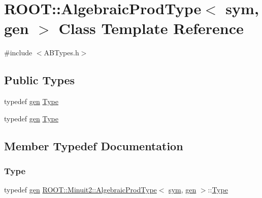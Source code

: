 \hypertarget{classROOT_1_1Minuit2_1_1AlgebraicProdType_3_01sym_00_01gen_01_4}{}\section{R\+O\+OT\+:\+:Algebraic\+Prod\+Type$<$ sym, gen $>$ Class Template Reference}
\label{classROOT_1_1Minuit2_1_1AlgebraicProdType_3_01sym_00_01gen_01_4}


{\ttfamily \#include $<$A\+B\+Types.\+h$>$}

\subsection*{Public Types}
\begin{DoxyCompactItemize}
\item 
typedef \mbox{\hyperlink{classROOT_1_1Minuit2_1_1gen}{gen}} \mbox{\hyperlink{classROOT_1_1Minuit2_1_1AlgebraicProdType_3_01sym_00_01gen_01_4_a963501c089513f1dfae4655d38218487}{Type}}
\item 
typedef \mbox{\hyperlink{classROOT_1_1Minuit2_1_1gen}{gen}} \mbox{\hyperlink{classROOT_1_1Minuit2_1_1AlgebraicProdType_3_01sym_00_01gen_01_4_a963501c089513f1dfae4655d38218487}{Type}}
\end{DoxyCompactItemize}


\subsection{Member Typedef Documentation}
\mbox{\label{classROOT_1_1Minuit2_1_1AlgebraicProdType_3_01sym_00_01gen_01_4_a963501c089513f1dfae4655d38218487}} 
\subsubsection{\texorpdfstring{Type}{Type}\hspace{0.1cm}{\footnotesize\ttfamily [1/2]}}
{\footnotesize\ttfamily typedef \mbox{\hyperlink{classROOT_1_1Minuit2_1_1gen}{gen}} \mbox{\hyperlink{classROOT_1_1Minuit2_1_1AlgebraicProdType}{R\+O\+O\+T\+::\+Minuit2\+::\+Algebraic\+Prod\+Type}}$<$ \mbox{\hyperlink{classROOT_1_1Minuit2_1_1sym}{sym}}, \mbox{\hyperlink{classROOT_1_1Minuit2_1_1gen}{gen}} $>$\+::\mbox{\hyperlink{classROOT_1_1Minuit2_1_1AlgebraicProdType_3_01sym_00_01gen_01_4_a963501c089513f1dfae4655d38218487}{Type}}}

